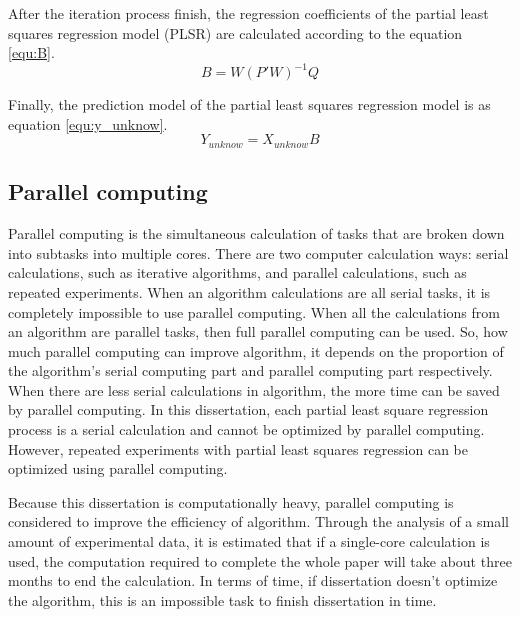 \documentclass[a4paper,12pt,titlepage]{article} %
\numberwithin{equation}{section}  %
\begin{document}
	After the iteration process finish, the regression coefficients of the partial least squares regression model (PLSR) are calculated according to the equation \ref{equ:B}.
	\begin{equation}
	B=W(P'W)^{-1}Q
	\label{equ:B} 
	\end{equation}
	
	Finally, the prediction model of the partial least squares regression model is as equation \ref{equ:y_unknow}.
	\begin{equation}
	Y_{unknow}=X_{unknow}B
	\label{equ:y_unknow} 
	\end{equation}
	
	\subsection{Parallel computing}
	\label{parallel}
	
	Parallel computing is the simultaneous calculation of tasks that are broken down into subtasks into multiple cores. There are two computer calculation ways: serial calculations, such as iterative algorithms, and parallel calculations, such as repeated experiments. When an algorithm calculations are all serial tasks, it is completely impossible to use parallel computing. When all the calculations from an algorithm are parallel tasks, then full parallel computing can be used. So, how much parallel computing can improve algorithm, it depends on the proportion of the algorithm's serial computing part and parallel computing part respectively. When there are less serial calculations in algorithm, the more time can be saved by parallel computing. In this dissertation, each partial least square regression process is a serial calculation and cannot be optimized by  parallel computing. However, repeated experiments with partial least squares regression can be optimized using parallel computing.
	
	Because this dissertation is computationally heavy, parallel computing is considered to improve the efficiency of algorithm. Through the analysis of a small amount of experimental data, it is estimated that if a single-core calculation is used, the computation required to complete the whole paper will take about three months to end the calculation. In terms of time, if  dissertation doesn't optimize the algorithm, this is an impossible task to finish dissertation in time.
	
\end{document}
